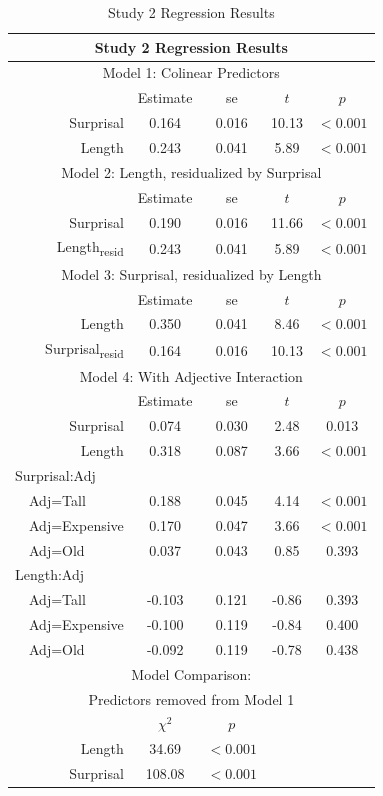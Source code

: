 \begin{appendices}
\begin{table}[h]
\center
\footnotesize
\begin{tabular}{r|cccc}
\hline
\hline
\multicolumn{5}{c}{\textbf{Study 2 Regression Results}} \\
\hline
\hline
\multicolumn{5}{c}{Model 1: Colinear Predictors} \\
& Estimate & se & $t$ & $p$ \\
\hline
Surprisal & 0.164 & 0.016 & 10.13 & $<0.001$ \\
Length & 0.243 & 0.041 & 5.89 & $<0.001$ \\
\hline
\hline
\multicolumn{5}{c}{Model 2: Length, residualized by Surprisal} \\
& Estimate & se & $t$ & $p$ \\
\hline
Surprisal & 0.190 & 0.016 & 11.66 & $<0.001$ \\
Length\textsubscript{resid} & 0.243 & 0.041 & 5.89 & $<0.001$ \\
\hline
\hline
\multicolumn{5}{c}{Model 3: Surprisal, residualized by Length} \\
& Estimate & se & $t$ & $p$ \\
\hline
Length & 0.350 & 0.041 & 8.46 & $<0.001$ \\
Surprisal\textsubscript{resid} & 0.164 & 0.016 & 10.13 & $<0.001$ \\
\hline
\hline
\multicolumn{5}{c}{Model 4: With Adjective Interaction} \\
& Estimate & se & $t$ & $p$ \\
\hline
Surprisal & 0.074 & 0.030 & 2.48 & 0.013 \\
Length & 0.318 & 0.087 & 3.66 & $<0.001$ \\
\multicolumn{1}{l|}{Surprisal:Adj} & & & & \\
\multicolumn{1}{l|}{\ \ Adj=Tall} & 0.188 & 0.045 & 4.14 & $<0.001$ \\
\multicolumn{1}{l|}{\ \ Adj=Expensive} & 0.170 & 0.047 & 3.66 & $<0.001$ \\
\multicolumn{1}{l|}{\ \ Adj=Old} & 0.037 & 0.043 & 0.85 & 0.393 \\
\multicolumn{1}{l|}{Length:Adj} & & & & \\
\multicolumn{1}{l|}{\ \ Adj=Tall} & -0.103 & 0.121 & -0.86 & 0.393 \\
\multicolumn{1}{l|}{\ \ Adj=Expensive} & -0.100 & 0.119 & -0.84 & 0.400 \\
\multicolumn{1}{l|}{\ \ Adj=Old} & -0.092 & 0.119 & -0.78 & 0.438 \\
\hline
\hline
\multicolumn{5}{c}{Model Comparison:} \\
\multicolumn{5}{c}{Predictors removed from Model 1} \\
& $\chi^2$ & $p$ \\
\hline
Length & 34.69 & $<0.001$ \\
Surprisal & 108.08 & $<0.001$ \\
\hline
\hline
\end{tabular}
\caption{Study 2 Regression Results}
\label{table:2}
\end{table}




\end{appendices}
